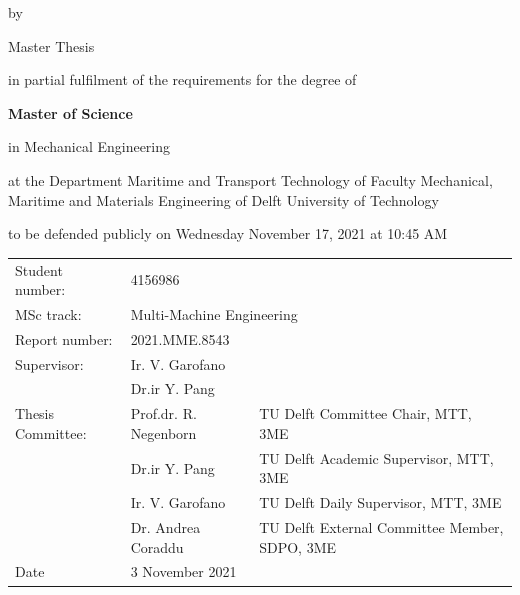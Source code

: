 \begin{titlepage}

\begin{center}

{\makeatletter
\largetitlestyle\color{tudelft-cyan}\fontsize{25}{25}\selectfont\@title
\makeatother}

{\makeatletter
\ifx\@subtitle\undefined\else
    \bigskip
   {\tudsffamily\fontsize{22}{32}\selectfont\@subtitle}    
\fi
\makeatother}

\bigskip
\bigskip

by

\bigskip
\bigskip

{\makeatletter
\largetitlestyle\fontsize{14.5}{14.5}\selectfont\@author
\makeatother}

\bigskip
\bigskip

\LARGE
Master Thesis
\normalsize
\bigskip
\bigskip

in partial fulfilment of the requirements for the degree of

\bigskip

\textbf{Master of Science}

in Mechanical Engineering
\bigskip

at the Department Maritime and Transport Technology of Faculty Mechanical, Maritime and Materials Engineering of Delft University of Technology

to be defended publicly on Wednesday November 17, 2021 at 10:45 AM 

\bigskip
\bigskip

\vfill
 	\begin{tabular}{lll}
 		Student number:   & \multicolumn{2}{l}{4156986}  \\
 		MSc track:        & \multicolumn{2}{l}{Multi-Machine Engineering}\\
 		Report number:    & \multicolumn{2}{l}{2021.MME.8543} \\
 		Supervisor:       & \multicolumn{2}{l}{Ir. V. Garofano} \\
 		& \multicolumn{2}{l}{Dr.ir Y. Pang} \\
 		Thesis Committee: & Prof.dr. R. Negenborn  & TU Delft Committee Chair, MTT, 3ME      \\
 		& Dr.ir Y. Pang  & TU Delft Academic Supervisor, MTT, 3ME   \\
 		& Ir. V. Garofano  & TU Delft Daily Supervisor, MTT, 3ME  \\
 		& Dr. Andrea Coraddu  & TU Delft External Committee Member, SDPO, 3ME  \\
 		Date              & \multicolumn{2}{l}{3 November 2021}                          
 	\end{tabular}
		




\end{center}
\end{titlepage}

